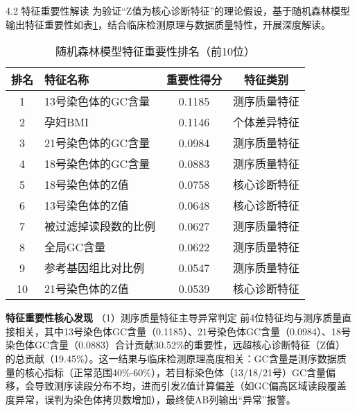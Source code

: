 \documentclass[withoutpreface,bwprint]{cumcmthesis} %
\begin{document}
4.2 特征重要性解读
为验证“Z值为核心诊断特征”的理论假设，基于随机森林模型输出特征重要性如表\ref{tab:随机森林模型特征排名}，结合临床检测原理与数据质量特性，开展深度解读。

\begin{table}[H]
    \centering  %
    \caption{随机森林模型特征重要性排名（前10位）}  %
    \label{tab:随机森林模型特征排名}  %
    \begin{threeparttable}
        \begin{tabularx}{0.75\textwidth}{c l c c}
            \toprule[1.5pt]
            \textbf{排名} & \textbf{特征名称} & \textbf{重要性得分} & \textbf{特征类别} \\ 
            \midrule[1pt]
            1    & 13号染色体的GC含量      & 0.1185     & 测序质量特征     \\
            2    & 孕妇BMI                 & 0.1146     & 个体差异特征     \\
            3    & 21号染色体的GC含量      & 0.0984     & 测序质量特征     \\
            4    & 18号染色体的GC含量      & 0.0883     & 测序质量特征     \\
            5    & 18号染色体的Z值         & 0.0758     & 核心诊断特征     \\
            6    & 13号染色体的Z值         & 0.0648     & 核心诊断特征     \\
            7    & 被过滤掉读段数的比例    & 0.0627     & 测序质量特征     \\
            8    & 全局GC含量              & 0.0622     & 测序质量特征     \\
            9    & 参考基因组比对比例      & 0.0547     & 测序质量特征     \\
            10   & 21号染色体的Z值         & 0.0539     & 核心诊断特征     \\

            \bottomrule[1.5pt]
        \end{tabularx}
    \end{threeparttable}
\end{table}


\textbf{特征重要性核心发现}
（1）测序质量特征主导异常判定
前4位特征均与测序质量直接相关，其中13号染色体GC含量（0.1185）、21号染色体GC含量（0.0984）、18号染色体GC含量（0.0883）合计贡献30.52\%的重要性，远超核心诊断特征（Z值）的总贡献（19.45\%）。这一结果与临床检测原理高度相关：GC含量是测序数据质量的核心指标（正常范围40\%-60\%），若目标染色体（13/18/21号）GC含量偏移，会导致测序读段分布不均，进而引发Z值计算偏差（如GC偏高区域读段覆盖度异常，误判为染色体拷贝数增加），最终使AB列输出“异常”报警。
\end{document}
